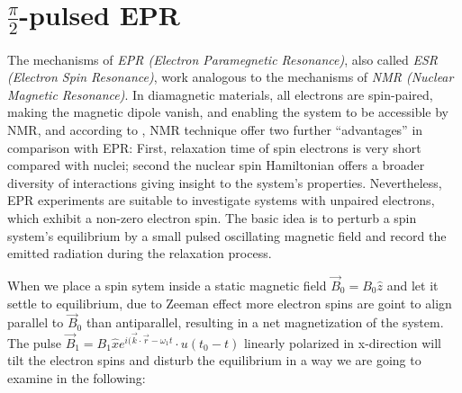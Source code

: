\documentclass[11.5pt,a4paper]{article}
\begin{document}
\section{$\tfrac{\pi}{2}$-pulsed EPR}
The mechanisms of \emph{EPR (Electron Paramegnetic Resonance)}, also called \emph{ESR (Electron Spin Resonance)}, work analogous to the mechanisms of \emph{NMR (Nuclear Magnetic Resonance)}. In diamagnetic materials, all electrons are spin-paired, making the magnetic dipole vanish, and enabling the system to be accessible by NMR, and according to \cite[Chap. 4, p. 107]{nmr-ox}, NMR technique offer two further ``advantages'' in comparison with EPR: First, relaxation time of spin electrons is very short compared with nuclei; second the nuclear spin Hamiltonian offers a broader diversity of interactions giving insight to the system's properties. Nevertheless, EPR experiments are suitable to investigate systems with unpaired electrons, which exhibit a non-zero electron spin. The basic idea is to perturb a spin system's equilibrium by a small pulsed oscillating magnetic field and record the emitted radiation during the relaxation process. 

When we place a spin sytem inside a static magnetic field $\vec{B}_0 = B_0 \hat{z}$ and let it settle to equilibrium, due to Zeeman effect more electron spins are goint to align parallel to $\vec{B}_0$ than antiparallel, resulting in a net magnetization of the system. The pulse $\vec{B}_1 = B_1 \hat{x} e^{i(\vec{k}\cdot\vec{r}-\omega_1 t} \cdot u(t_0-t)$ linearly polarized in x-direction will tilt the electron spins and disturb the equilibrium in a way we are going to examine in the following:
\end{document}
